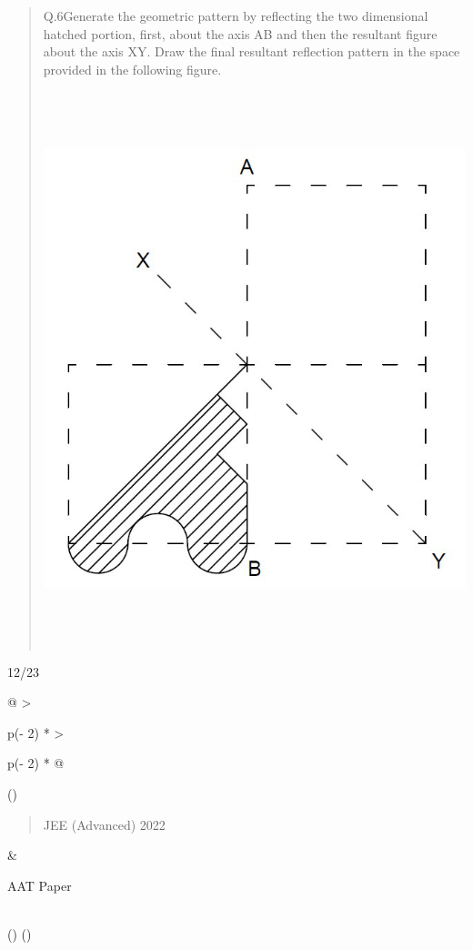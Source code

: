 \documentclass[
]{article}
\begin{document}
\begin{quote}
Q.6Generate the geometric pattern by reflecting the two dimensional
hatched portion, first, about the axis AB and then the resultant figure
about the axis XY. Draw the final resultant reflection pattern in the
space provided in the following figure.

\includegraphics[width=6.11805in,height=6.35in]{vertopal_2361032064654423b71b7db67d98c753/media/image13.png}
\end{quote}

12/23

\begin{longtable}[]{@{}
  >{\raggedright\arraybackslash}p{(\columnwidth - 2\tabcolsep) * }
  >{\raggedright\arraybackslash}p{(\columnwidth - 2\tabcolsep) * }@{}}
\toprule()
\begin{minipage}[b]{\linewidth}\raggedright
\begin{quote}
JEE (Advanced) 2022
\end{quote}
\end{minipage} & \begin{minipage}[b]{\linewidth}\raggedright
AAT Paper
\end{minipage} \\
\midrule()
\endhead
\bottomrule()
\end{longtable}
\end{document}
